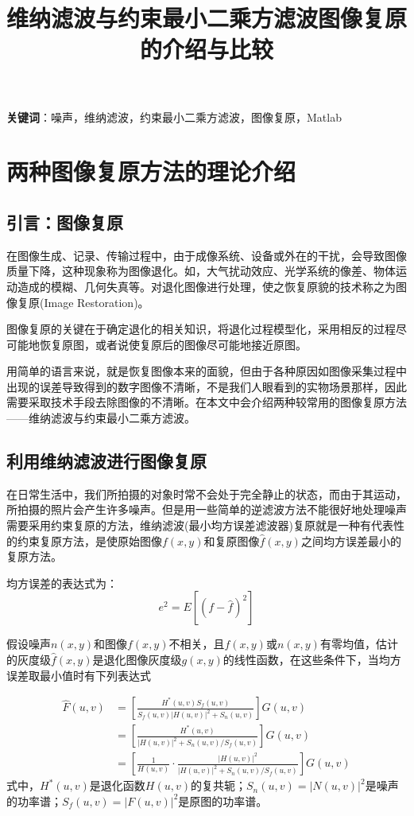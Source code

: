 \documentclass[UTF8]{ctexart}
\title{\heiti 维纳滤波与约束最小二乘方滤波图像复原的介绍与比较}
\author{}
\date{}
\begin{document}
    \maketitle
    \textbf{关键词}：噪声，维纳滤波，约束最小二乘方滤波，图像复原，Matlab
    \section{两种图像复原方法的理论介绍}
    \subsection{引言：图像复原}
    在图像生成、记录、传输过程中，由于成像系统、设备或外在的干扰，会导致图像质量下降，这种现象称为图像退化。如，大气扰动效应、光学系统的像差、物体运动造成的模糊、几何失真等。对退化图像进行处理，使之恢复原貌的技术称之为图像复原(Image Restoration)。

    图像复原的关键在于确定退化的相关知识，将退化过程模型化，采用相反的过程尽可能地恢复原图，或者说使复原后的图像尽可能地接近原图。

    用简单的语言来说，就是恢复图像本来的面貌，但由于各种原因如图像采集过程中出现的误差导致得到的数字图像不清晰，不是我们人眼看到的实物场景那样，因此需要采取技术手段去除图像的不清晰。在本文中会介绍两种较常用的图像复原方法——维纳滤波与约束最小二乘方滤波。
    \subsection{利用维纳滤波进行图像复原}
    在日常生活中，我们所拍摄的对象时常不会处于完全静止的状态，而由于其运动，所拍摄的照片会产生许多噪声。但是用一些简单的逆滤波方法不能很好地处理噪声需要采用约束复原的方法，维纳滤波(最小均方误差滤波器)复原就是一种有代表性的约束复原方法，是使原始图像$f(x,y)$和复原图像$\hat{f}(x,y)$之间均方误差最小的复原方法。

    均方误差的表达式为：
    \begin{equation}
        e^2=E\left[(f-\hat{f})^2\right]
    \end{equation}

    假设噪声$n(x,y)$和图像$f(x,y)$不相关，且$f(x,y)$或$n(x,y)$有零均值，估计的灰度级$\hat{f}(x,y)$是退化图像灰度级$g(x,y)$的线性函数，在这些条件下，当均方误差取最小值时有下列表达式

    \begin{equation}\label{eqsetmin}
    \begin{split}
        \hat{F}(u,v)&=\left[\frac{H^*(u,v)S_f(u,v)}{S_f(u,v)|H(u,v)|^2+S_n(u,v)}\right]G(u,v)\\
        &=\left[\frac{H^*(u,v)}{|H(u,v)|^2+S_n(u,v)/S_f(u,v)}\right]G(u,v)\\
        &=\left[\frac{1}{H(u,v)}\cdot\frac{|H(u,v)|^2}{|H(u,v)|^2+S_n(u,v)/S_f(u,v)}\right]G(u,v)
    \end{split}
    \end{equation}
    式中，$H^*(u,v)$是退化函数$H(u,v)$的复共轭；$S_n(u,v)=|N(u,v)|^2$是噪声的功率谱；$S_f(u,v)=|F(u,v)|^2$是原图的功率谱。
\end{document}
